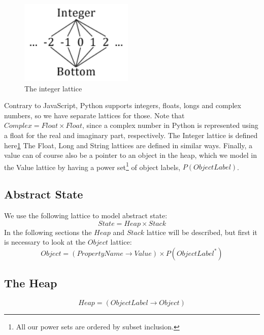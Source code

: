 \begin{figure}
	\vspace{-20pt}
	\begin{center}
		\includegraphics[width=0.48\textwidth]{images/integer-lattice.png}
	\end{center}
	\vspace{-10pt}
	\caption{The integer lattice}
	\label{fig:latticeInteger}
	\vspace{-10pt}
\end{figure}
Contrary to JavaScript, Python supports integers, floats, longs and complex numbers, so we have separate lattices for those. Note that $Complex = Float \times Float$, since a complex number in Python is represented using a float for the real and imaginary part, respectively\cite{pyref.stdtypes}. The Integer lattice is defined here\ref{fig:latticeInteger}
The Float, Long and String lattices are defined in similar ways. Finally, a value can of course also be a pointer to an object in the heap, which we model in the Value lattice by having a power set\footnote{All our power sets are ordered by subset inclusion.} of object labels, $P(ObjectLabel)$.

\subsection{Abstract State}
We use the following lattice to model abstract state:
\begin{equation*}
State = Heap \times Stack
\end{equation*}
In the following sections the $Heap$ and $Stack$ lattice will be described, but first it is necessary to look at the $Object$ lattice:
\begin{equation*}
Object = (PropertyName \rightarrow Value) \times P(ObjectLabel^{*})
\end{equation*}

\subsection{The Heap}
\begin{equation*}
Heap = (ObjectLabel \rightarrow Object)
\end{equation*}

